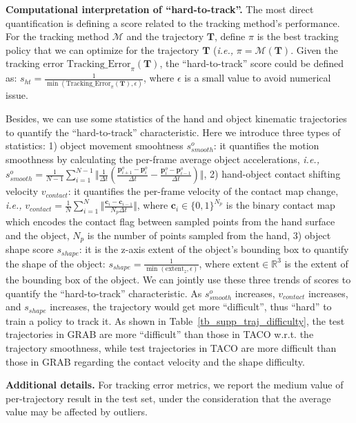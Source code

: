 \textcolor{myblue}{\noindent\textbf{Computational interpretation of ``hard-to-track''.}
The most direct quantification is defining a score related to the tracking method's performance. For the tracking method $\mathcal{M}$ and the trajectory $\mathbf{T}$, define $\pi$ is the best tracking policy that we can optimize for the trajectory $\mathbf{T}$ (\textit{i.e.,} $\pi = \mathcal{M}(\mathbf{T})$. Given the tracking error $\text{Tracking\_Error}_{\pi}(\mathbf{T})$, the ``hard-to-track'' score could be defined as: $s_{ht}=\frac{1}{\min(\text{Tracking\_Error}_{\pi}(\mathbf{T}), \epsilon)}$, where $\epsilon$ is a small value to avoid numerical issue. }

\textcolor{myblue}{
Besides, we can use some statistics of the hand and object kinematic trajectories to quantify the ``hard-to-track'' characteristic. Here we introduce three types of statistics: 1) object movement smoohtness $s^o_{smooth}$: it quantifies the motion smoothness by calculating the per-frame average object accelerations, \textit{i.e.,} $s_{smooth}^o=\frac{1}{N-1}\sum_{i=1}^{N-1}\Vert \frac{1}{\Delta t} (\frac{\mathbf{p}^o_{i+1}-\mathbf{p}^o_{i}}{\Delta t} - \frac{\mathbf{p}_{i}^o-\mathbf{p}_{i-1}^o}{\Delta t} )\Vert$, 2) hand-object contact shifting velocity $v_{contact}$: it quantifies the per-frame velocity of the contact map change, \textit{i.e.,} $v_{contact}=\frac{1}{N}\sum_{i=1}^{N}\Vert \frac{\mathbf{c}_{i} - \mathbf{c}_{i-1}}{N_p\Delta t} \Vert $, where $\mathbf{c}_i\in \{ 0,1 \}^{N_p}$ is the binary contact map which encodes the contact flag between sampled points from the hand surface and the object, $N_p$ is the number of points sampled from the hand, 3) object shape score $s_{shape}$: it is the z-axis extent of the object's bounding box to quantify the shape of the object: $s_{shape} = \frac{1}{\min(\text{extent}_z, \epsilon)}$, where $\text{extent}\in \mathbb{R}^3$ is the extent of the bounding box of the object. We can jointly use these three trends of scores to quantify the ``hard-to-track'' characteristic. As $s_{smooth}^o$ increases, $v_{contact}$ increases, and $s_{shape}$ increases, the trajectory would get more ``difficult'', thus ``hard'' to train a policy to track it. 
As shown in Table~\ref{tb_supp_traj_difficulty}, the test trajectories in GRAB are more ``difficult'' than those in TACO w.r.t. the trajectory smoothness, while test trajectories in TACO are more difficult than those in GRAB regarding the contact velocity and the shape difficulty. 
}




\noindent\textbf{Additional details.} For tracking error metrics, we report the medium value of per-trajectory result in the test set, under the consideration that the average value may be affected by outliers. 



